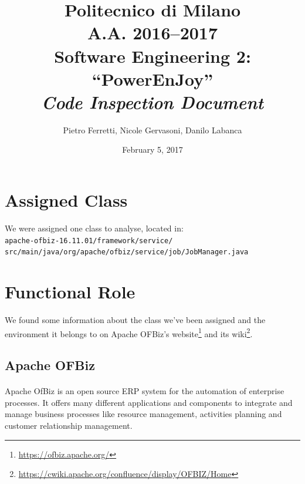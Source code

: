 \documentclass[english]{article}
\begin{document}
\title{Politecnico di Milano\\
 A.A. 2016–2017 \\
Software Engineering 2: “PowerEnJoy” \\
\emph{\textbf{Code Inspection Document}}}

\author{Pietro Ferretti, Nicole Gervasoni, Danilo Labanca}
\date{February 5, 2017}
\maketitle

\newpage

\tableofcontents{}

\newpage

\section{Assigned Class}
We were assigned one class to analyse, located in:\\

\texttt{apache-ofbiz-16.11.01/framework/service/\\
\hspace*{1cm}src/main/java/org/apache/ofbiz/service/job/JobManager.java}

\section{Functional Role}%

We found some information about the class we've been assigned and the environment it belongs to on Apache OFBiz's website\footnote{\href{https://ofbiz.apache.org/}{https://ofbiz.apache.org/}}
and its wiki\footnote{\href{https://cwiki.apache.org/confluence/display/OFBIZ/Home}{https://cwiki.apache.org/confluence/display/OFBIZ/Home}}.

\subsection{Apache OFBiz}
\paragraph{}
Apache OfBiz is an open source ERP system for the automation of enterprise processes. It offers many different applications and components to integrate and manage business processes like resource management, activities planning and customer relationship management.
\end{document}
